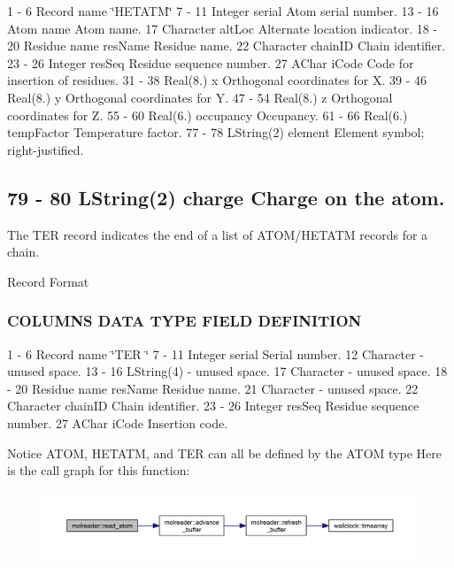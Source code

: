 1 -\/ 6 Record name \char`\"{}\+H\+E\+T\+A\+T\+M\char`\"{} 7 -\/ 11 Integer serial Atom serial number. 13 -\/ 16 Atom name Atom name. 17 Character alt\+Loc Alternate location indicator. 18 -\/ 20 Residue name res\+Name Residue name. 22 Character chain\+ID Chain identifier. 23 -\/ 26 Integer res\+Seq Residue sequence number. 27 A\+Char i\+Code Code for insertion of residues. 31 -\/ 38 Real(8.) x Orthogonal coordinates for X. 39 -\/ 46 Real(8.) y Orthogonal coordinates for Y. 47 -\/ 54 Real(8.) z Orthogonal coordinates for Z. 55 -\/ 60 Real(6.) occupancy Occupancy. 61 -\/ 66 Real(6.) temp\+Factor Temperature factor. 77 -\/ 78 L\+String(2) element Element symbol; right-\/justified. \subsection*{79 -\/ 80 L\+String(2) charge Charge on the atom. }

The T\+ER record indicates the end of a list of A\+T\+O\+M/\+H\+E\+T\+A\+TM records for a chain.

Record Format

\subsubsection*{C\+O\+L\+U\+M\+NS D\+A\+TA T\+Y\+PE F\+I\+E\+LD D\+E\+F\+I\+N\+I\+T\+I\+ON }

1 -\/ 6 Record name \char`\"{}\+T\+E\+R   \char`\"{} 7 -\/ 11 Integer serial Serial number. 12 Character -\/ unused space. 13 -\/ 16 L\+String(4) -\/ unused space. 17 Character -\/ unused space. 18 -\/ 20 Residue name res\+Name Residue name. 21 Character -\/ unused space. 22 Character chain\+ID Chain identifier. 23 -\/ 26 Integer res\+Seq Residue sequence number. 27 A\+Char i\+Code Insertion code.

Notice A\+T\+OM, H\+E\+T\+A\+TM, and T\+ER can all be defined by the A\+T\+OM type Here is the call graph for this function\+:\nopagebreak
\begin{figure}[H]
\begin{center}
\leavevmode
\includegraphics[width=350pt]{namespacemolreader_a49ccaf345b633e27f69ad7a5a8637a2a_cgraph}
\end{center}
\end{figure}
\mbox{\label{namespacemolreader_af85c1b386f0dc78ebf55e003b4f8c83a}} 

